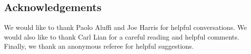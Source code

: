 \documentclass[12 pt, reqno]{amsart}
\theoremstyle{definition}
\begin{document}

\subsection{Acknowledgements}
We would like to thank Paolo Aluffi and Joe Harris for helpful
conversations. We would also like to thank Carl Lian for a careful
reading and helpful comments.  Finally, we thank an anonymous referee
for helpful suggestions.
\end{document}
